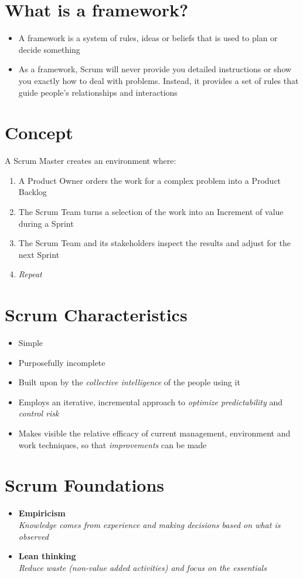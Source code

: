 \documentclass[a4paper,11pt,twocolumn]{article}
\begin{document}
\section*{What is a framework?}
\begin{itemize}
	\item A framework is a system of rules, ideas or beliefs that is used to plan or decide something
	\item As a framework, Scrum will never provide you detailed instructions or show you exactly how to deal with problems. Instead, it provides a set of rules that guide people's relationships and interactions
\end{itemize}


\section*{Concept}
A Scrum Master creates an environment where:
\begin{enumerate}
	\item A Product Owner orders the work for a complex problem into a Product Backlog
	\item The Scrum Team turns a selection of the work into an Increment of value during a Sprint
	\item The Scrum Team and its stakeholders inspect the results and adjust for the next Sprint
	\item \textit{Repeat}
\end{enumerate}

\section*{Scrum Characteristics}
\begin{itemize}
	\item Simple
	\item Purposefully incomplete
	\item Built upon by the \textit{collective intelligence} of the people using it
	\item Employs an iterative, incremental approach to \textit{optimize predictability} and \textit{control risk}
	\item Makes visible the relative efficacy of current management, environment and work techniques, so that \textit{improvements} can be made
\end{itemize}

\section*{Scrum Foundations}
\begin{itemize}
	\item \textbf{Empiricism}\\
	      \textit{Knowledge comes from experience and making decisions based on what is observed}
	\item \textbf{Lean thinking}\\
	      \textit{Reduce waste (non-value added activities) and focus on the essentials}
\end{itemize}
\end{document}
